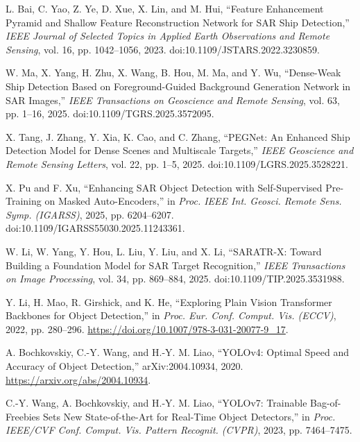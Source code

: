 
L. Bai, C. Yao, Z. Ye, D. Xue, X. Lin, and M. Hui,
``Feature Enhancement Pyramid and Shallow Feature Reconstruction Network for SAR Ship Detection,''
\emph{IEEE Journal of Selected Topics in Applied Earth Observations and Remote Sensing},
vol. 16, pp. 1042--1056, 2023. doi:10.1109/JSTARS.2022.3230859.

W. Ma, X. Yang, H. Zhu, X. Wang, B. Hou, M. Ma, and Y. Wu,
``Dense-Weak Ship Detection Based on Foreground-Guided Background Generation Network in SAR Images,''
\emph{IEEE Transactions on Geoscience and Remote Sensing},
vol. 63, pp. 1--16, 2025. doi:10.1109/TGRS.2025.3572095.

X. Tang, J. Zhang, Y. Xia, K. Cao, and C. Zhang,
``PEGNet: An Enhanced Ship Detection Model for Dense Scenes and Multiscale Targets,''
\emph{IEEE Geoscience and Remote Sensing Letters},
vol. 22, pp. 1--5, 2025. doi:10.1109/LGRS.2025.3528221.

X. Pu and F. Xu,
``Enhancing SAR Object Detection with Self-Supervised Pre-Training on Masked Auto-Encoders,''
in \emph{Proc. IEEE Int. Geosci. Remote Sens. Symp. (IGARSS)},
2025, pp. 6204--6207. doi:10.1109/IGARSS55030.2025.11243361.

W. Li, W. Yang, Y. Hou, L. Liu, Y. Liu, and X. Li,
``SARATR-X: Toward Building a Foundation Model for SAR Target Recognition,''
\emph{IEEE Transactions on Image Processing},
vol. 34, pp. 869--884, 2025. doi:10.1109/TIP.2025.3531988.

Y. Li, H. Mao, R. Girshick, and K. He,
``Exploring Plain Vision Transformer Backbones for Object Detection,''
in \emph{Proc. Eur. Conf. Comput. Vis. (ECCV)},
2022, pp. 280--296. \url{https://doi.org/10.1007/978-3-031-20077-9_17}.

A. Bochkovskiy, C.-Y. Wang, and H.-Y. M. Liao,
``YOLOv4: Optimal Speed and Accuracy of Object Detection,''
arXiv:2004.10934, 2020. \url{https://arxiv.org/abs/2004.10934}.

C.-Y. Wang, A. Bochkovskiy, and H.-Y. M. Liao,
``YOLOv7: Trainable Bag-of-Freebies Sets New State-of-the-Art for Real-Time Object Detectors,''
in \emph{Proc. IEEE/CVF Conf. Comput. Vis. Pattern Recognit. (CVPR)},
2023, pp. 7464--7475.

